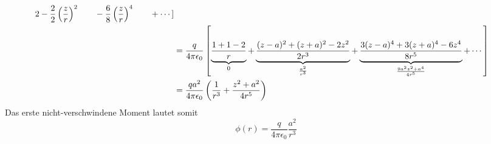\documentclass[11pt a4paper]{article}
\newcommand{\epsz}{\epsilon_0}
\begin{document}
\begin{align*}
			2 - \frac{2}{2} \left(\frac{z}{r}\right)^2
			\hspace{0.7cm}
			-\frac{6}{8} \left(\frac{z}{r}\right)^4
			\hspace{0.7cm} +  \dotsb] \\
	&= \frac{q}{4\pi\epsz} \left[
		\underbrace{\frac{1+1-2}{r}}_{0} +
		\underbrace{\frac{(z-a)^2 + (z+a)^2 - 2z^2}{2 r^3}}_{
			\frac{a^2}{r^3}}
		+ 
		\underbrace{\frac{3 (z-a)^4 + 3 (z+a)^4 - 6 z^4}{8 r^5}}_{
			\frac{9a^2 z^2 + a^4}{4r^5}} + \dotsb
		\right] \\
	&= \frac{q a^2}{4\pi\epsz} \left(
	\frac{1}{r^3} + \frac{z^2 + a^2}{4r^5} \right)
\end{align*}
Das erste nicht-verschwindene Moment lautet somit
\[
	\phi (r) = \frac{q}{4\pi\epsz} \frac{a^2}{r^3}
\]


	


\newpage
\end{document}

